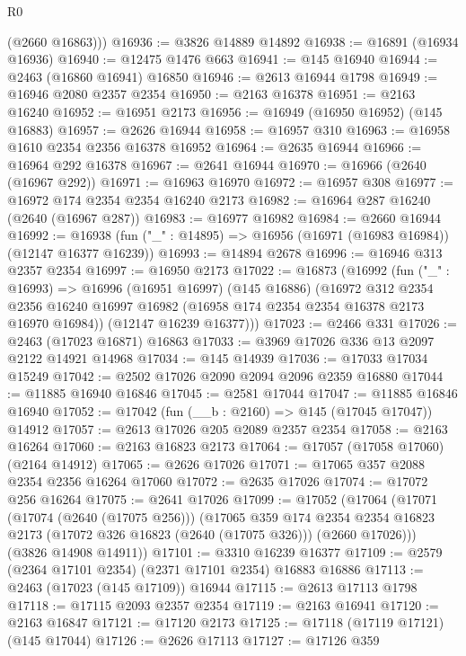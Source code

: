 \begin{lexlean}{R0}
\begin{coremodule}
        (@2660 @16863)))
@16936 := @3826 @14889 @14892
@16938 := @16891 (@16934 @16936)
@16940 := @12475 @1476 @663
@16941 := @145 @16940
@16944 := @2463 (@16860 @16941) @16850
@16946 := @2613 @16944 @1798
@16949 := @16946 @2080 @2357 @2354
@16950 := @2163 @16378
@16951 := @2163 @16240
@16952 := @16951 @2173
@16956 := @16949 (@16950 @16952) (@145 @16883)
@16957 := @2626 @16944
@16958 := @16957 @310
@16963 := @16958 @1610 @2354 @2356 @16378 @16952
@16964 := @2635 @16944
@16966 := @16964 @292 @16378
@16967 := @2641 @16944
@16970 := @16966 (@2640 (@16967 @292))
@16971 := @16963 @16970
@16972 := @16957 @308
@16977 := @16972 @174 @2354 @2354 @16240 @2173
@16982 := @16964 @287 @16240 (@2640 (@16967 @287))
@16983 := @16977 @16982
@16984 := @2660 @16944
@16992 := @16938 (fun ("_" : @14895) => @16956 (@16971 (@16983 @16984)) (@12147 @16377 @16239))
@16993 := @14894 @2678
@16996 := @16946 @313 @2357 @2354
@16997 := @16950 @2173
@17022 := @16873
    (@16992
      (fun ("_" : @16993) =>
      @16996
        (@16951 @16997)
        (@145 @16886)
        (@16972
          @312
          @2354
          @2356
          @16240
          @16997
          @16982
          (@16958 @174 @2354 @2354 @16378 @2173 @16970 @16984))
        (@12147 @16239 @16377)))
@17023 := @2466 @331
@17026 := @2463 (@17023 @16871) @16863
@17033 := @3969 @17026 @336 @13 @2097 @2122 @14921 @14968
@17034 := @145 @14939
@17036 := @17033 @17034 @15249
@17042 := @2502 @17026 @2090 @2094 @2096 @2359 @16880
@17044 := @11885 @16940 @16846
@17045 := @2581 @17044
@17047 := @11885 @16846 @16940
@17052 := @17042 (fun (__b : @2160) => @145 (@17045 @17047)) @14912
@17057 := @2613 @17026 @205 @2089 @2357 @2354
@17058 := @2163 @16264
@17060 := @2163 @16823 @2173
@17064 := @17057 (@17058 @17060) (@2164 @14912)
@17065 := @2626 @17026
@17071 := @17065 @357 @2088 @2354 @2356 @16264 @17060
@17072 := @2635 @17026
@17074 := @17072 @256 @16264
@17075 := @2641 @17026
@17099 := @17052
    (@17064
      (@17071
        (@17074 (@2640 (@17075 @256)))
        (@17065
          @359
          @174
          @2354
          @2354
          @16823
          @2173
          (@17072 @326 @16823 (@2640 (@17075 @326)))
          (@2660 @17026)))
      (@3826 @14908 @14911))
@17101 := @3310 @16239 @16377
@17109 := @2579 (@2364 @17101 @2354) (@2371 @17101 @2354) @16883 @16886
@17113 := @2463 (@17023 (@145 @17109)) @16944
@17115 := @2613 @17113 @1798
@17118 := @17115 @2093 @2357 @2354
@17119 := @2163 @16941
@17120 := @2163 @16847
@17121 := @17120 @2173
@17125 := @17118 (@17119 @17121) (@145 @17044)
@17126 := @2626 @17113
@17127 := @17126 @359

\end{coremodule}
\end{lexlean}
